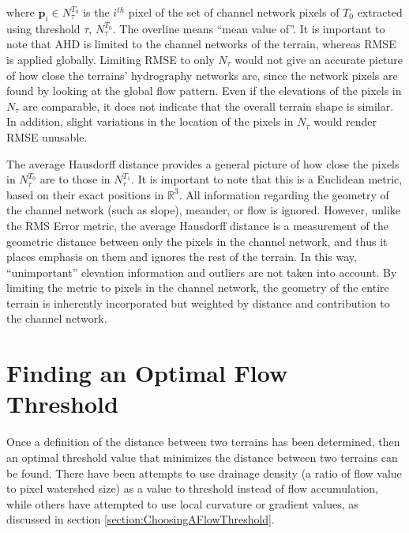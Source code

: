 \noindent where 
$\textbf{p}_{i} \in N^{T_{0}}_{\tau}$ is the $i^{th}$ pixel of the set of channel network pixels 
of $T_{0}$ extracted using threshold $\tau$, $N^{T_{0}}_{\tau}$. The overline means ``mean value of''. 
It is important to note that AHD is limited to the channel networks of the terrain, whereas RMSE is applied globally. 
Limiting RMSE to only $N_{\tau}$ would not give an accurate picture of how close the terrains' hydrography networks are, 
since the network pixels are found by looking at the global flow pattern. Even if the elevations of the pixels in $N_{\tau}$ 
are comparable, it does not indicate that the overall terrain shape is similar. In addition, slight variations 
in the location of the pixels in $N_{\tau}$ would render RMSE unusable.



The average Hausdorff distance provides a general picture of how close the pixels in $N^{T_{0}}_{\tau}$ are to those in $N^{T_{1}}_{\tau}$. It is important to note that this is a Euclidean metric, based on their exact positions in $\mathbb{R}^{3}$. All information regarding the geometry of the channel network (such as slope), meander, or flow is ignored. However, unlike the RMS Error metric, the average Hausdorff distance is a measurement of the geometric distance between only the pixels in the channel network, and thus it places emphasis on them and ignores the rest of the terrain. In this way, ``unimportant'' elevation information and outliers are not taken into account. By limiting the metric to pixels in the channel network, the geometry of the entire terrain is inherently incorporated but weighted by distance and contribution to the channel network.





\section{Finding an Optimal Flow Threshold}

Once a definition of the distance between two terrains has been determined, then an optimal threshold value that minimizes the distance between two terrains can be found. 
% 
There have been attempts to use drainage density (a ratio of flow value to pixel watershed size) as a value to threshold instead of flow accumulation, while others have attempted to use local curvature or gradient values, as discussed in section \ref{section:ChoosingAFlowThreshold}. 


